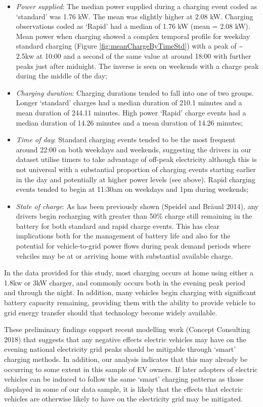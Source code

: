 \documentclass[]{article}
\providecommand{\tightlist}{%
  \setlength{\itemsep}{0pt}\setlength{\parskip}{0pt}}
\begin{document}
\begin{itemize}
\tightlist
\item
  \emph{Power supplied}: The median power supplied during a charging event coded as `standard' was 1.76 kW. The mean was slightly higher at 2.08 kW. Charging observations coded as `Rapid' had a median of 1.76 kW (mean = 2.08 kW). Mean power when charging showed a complex temporal profile for weekday standard charging (Figure \ref{fig:meanChargeByTimeStd}) with a peak of \textasciitilde{} 2.5kw at 10:00 and a second of the same value at around 18:00 with further peaks just after midnight. The inverse is seen on weekends with a charge peak during the middle of the day;
\item
  \emph{Charging duration}: Charging durations tended to fall into one of two groups. Longer `standard' charges had a median duration of 210.1 minutes and a mean duration of 244.11 minutes. High power `Rapid' charge events had a median duration of 14.26 minutes and a mean duration of 14.26 minutes;
\item
  \emph{Time of day}: Standard charging events tended to be the most frequent around 22:00 on both weekdays and weekends, suggesting the drivers in our dataset utilise timers to take advantage of off-peak electricity although this is not universal with a substantial proportion of charging events starting earlier in the day and potentially at higher power levels (see above). Rapid charging events tended to begin at 11:30am on weekdays and 1pm during weekends;
\item
  \emph{State of charge}: As has been previously shown (Speidel and Bräunl 2014), any drivers begin recharging with greater than 50\% charge still remaining in the battery for both standard and rapid charge events. This has clear implications both for the management of battery life and also for the potential for vehicle-to-grid power flows during peak demand periods where vehciles may be at or arriving home with substantial available charge.
\end{itemize}

In the data provided for this study, most charging occurs at home using either a 1.8kw or 3kW charger, and commonly occurs both in the evening peak period and through the night. In addition, many vehicles begin charging with significant battery capacity remaining, providing them with the ability to provide vehicle to grid energy transfer should that technology become widely available.

These preliminary findings support recent modelling work (Concept Consulting 2018) that suggests that any negative effects electric vehicles may have on the evening national electricity grid peaks should be mitigable through `smart' charging methods. In addition, our analysis indicates that this may already be occurring to some extent in this sample of EV owners. If later adopters of electric vehicles can be induced to follow the same `smart' charging patterns as those displayed in some of our data sample, it is likely that the effects that electric vehicles are otherwise likely to have on the electricity grid may be mitigated.
\end{document}
